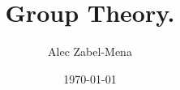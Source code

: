 \documentclass[12pt, twoside]{book}
\title{Group Theory.}
\author{Alec Zabel-Mena}
\date{\today}
\theoremstyle{plain}
\theoremstyle{definition}
\theoremstyle{remark}
\begin{document}
\maketitle
\tableofcontents
\newpage





\nocite{*}



\end{document}

